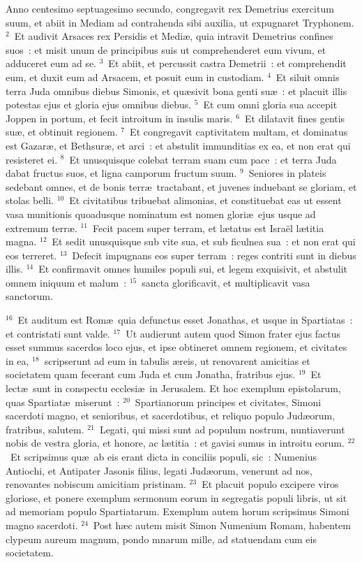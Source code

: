 \lettrine[lines=3,image=true,loversize=0.05,lraise=-0.03]{A}{}nno centesimo septuagesimo secundo, congregavit rex Demetrius exercitum suum, et abiit in Mediam ad contrahenda sibi auxilia, ut expugnaret Tryphonem.
${}^{2}$~Et audivit Arsaces rex Persidis et Medi\ae , quia intravit Demetrius confines suos~: et misit unum de principibus suis ut comprehenderet eum vivum, et adduceret eum ad se.
${}^{3}$~Et abiit, et percussit castra Demetrii~: et comprehendit eum, et duxit eum ad Arsacem, et posuit eum in custodiam.
${}^{4}$~Et siluit omnis terra Juda omnibus diebus Simonis, et qu\ae sivit bona genti su\ae~: et placuit illis potestas ejus et gloria ejus omnibus diebus.
${}^{5}$~Et cum omni gloria sua accepit Joppen in portum, et fecit introitum in insulis maris.
${}^{6}$~Et dilatavit fines gentis su\ae , et obtinuit regionem.
${}^{7}$~Et congregavit captivitatem multam, et dominatus est Gazar\ae , et Bethsur\ae , et arci~: et abstulit immunditias ex ea, et non erat qui resisteret ei.
${}^{8}$~Et unusquisque colebat terram suam cum pace~: et terra Juda dabat fructus suos, et ligna camporum fructum suum.
${}^{9}$~Seniores in plateis sedebant omnes, et de bonis terr\ae\ tractabant, et juvenes induebant se gloriam, et stolas belli.
${}^{10}$~Et civitatibus tribuebat alimonias, et constituebat eas ut essent vasa munitionis quoadusque nominatum est nomen glori\ae\ ejus usque ad extremum terr\ae .
${}^{11}$~Fecit pacem super terram, et l\ae tatus est Isra\"el l\ae titia magna.
${}^{12}$~Et sedit unusquisque sub vite sua, et sub ficulnea sua~: et non erat qui eos terreret.
${}^{13}$~Defecit impugnans eos super terram~: reges contriti sunt in diebus illis.
${}^{14}$~Et confirmavit omnes humiles populi sui, et legem exquisivit, et abstulit omnem iniquum et malum~:
${}^{15}$~sancta glorificavit, et multiplicavit vasa sanctorum.


${}^{16}$~Et auditum est Rom\ae\ quia defunctus esset Jonathas, et usque in Spartiatas~: et contristati sunt valde.
${}^{17}$~Ut audierunt autem quod Simon frater ejus factus esset summus sacerdos loco ejus, et ipse obtineret omnem regionem, et civitates in ea,
${}^{18}$~scripserunt ad eum in tabulis \ae reis, ut renovarent amicitias et societatem quam fecerant cum Juda et cum Jonatha, fratribus ejus.
${}^{19}$~Et lect\ae\ sunt in conspectu ecclesi\ae\ in Jerusalem. Et hoc exemplum epistolarum, quas Spartiat\ae\ miserunt~:
${}^{20}$~Spartianorum principes et civitates, Simoni sacerdoti magno, et senioribus, et sacerdotibus, et reliquo populo Jud\ae orum, fratribus, salutem.
${}^{21}$~Legati, qui missi sunt ad populum nostrum, nuntiaverunt nobis de vestra gloria, et honore, ac l\ae titia~: et gavisi sumus in introitu eorum.
${}^{22}$~Et scripsimus qu\ae\ ab eis erant dicta in conciliis populi, sic~: Numenius Antiochi, et Antipater Jasonis filius, legati Jud\ae orum, venerunt ad nos, renovantes nobiscum amicitiam pristinam.
${}^{23}$~Et placuit populo excipere viros gloriose, et ponere exemplum sermonum eorum in segregatis populi libris, ut sit ad memoriam populo Spartiatarum. Exemplum autem horum scripsimus Simoni magno sacerdoti.
${}^{24}$~Post h\ae c autem misit Simon Numenium Romam, habentem clypeum aureum magnum, pondo mnarum mille, ad statuendam cum eis societatem.

